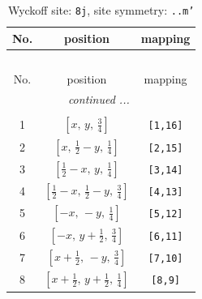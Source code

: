 \documentclass[fleqn,8pt]{jsarticle}
\begin{document}
\begin{longtable}{ccc}
\caption{Wyckoff site: {\tt 8j}, site symmetry: {\tt ..m'}}
 \\
 \hline \hline
No. & position & mapping \\ \hline \endfirsthead

\multicolumn{2}{l}{\tablename\ \thetable{}} \\
 \hline \hline
No. & position & mapping \\ \hline \endhead

 \hline \hline
\multicolumn{2}{r}{\footnotesize\it continued ...} \\ \endfoot

 \hline \hline
\multicolumn{2}{r}{} \\ \endlastfoot

1 & $\left[ x,\, y,\, \frac{3}{4} \right]$ & {\tt [1,16]} \\ \hline
2 & $\left[ x,\, \frac{1}{2} - y,\, \frac{1}{4} \right]$ & {\tt [2,15]} \\ \hline
3 & $\left[ \frac{1}{2} - x,\, y,\, \frac{1}{4} \right]$ & {\tt [3,14]} \\ \hline
4 & $\left[ \frac{1}{2} - x,\, \frac{1}{2} - y,\, \frac{3}{4} \right]$ & {\tt [4,13]} \\ \hline
5 & $\left[ - x,\, - y,\, \frac{1}{4} \right]$ & {\tt [5,12]} \\ \hline
6 & $\left[ - x,\, y + \frac{1}{2},\, \frac{3}{4} \right]$ & {\tt [6,11]} \\ \hline
7 & $\left[ x + \frac{1}{2},\, - y,\, \frac{3}{4} \right]$ & {\tt [7,10]} \\ \hline
8 & $\left[ x + \frac{1}{2},\, y + \frac{1}{2},\, \frac{1}{4} \right]$ & {\tt [8,9]} \\
\end{longtable}
\renewcommand{\arraystretch}{1.2}
\end{document}
